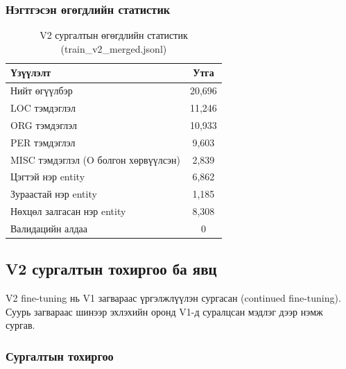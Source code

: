 \subsubsection{Нэгтгэсэн өгөгдлийн статистик}

\begin{table}[h!]
\centering
\renewcommand{\arraystretch}{1.4}
\begin{tabular}{|l|c|}
\hline
\textbf{Үзүүлэлт} & \textbf{Утга} \\ \hline
Нийт өгүүлбэр & 20,696 \\ \hline
LOC тэмдэглэл & 11,246 \\ \hline
ORG тэмдэглэл & 10,933 \\ \hline
PER тэмдэглэл & 9,603 \\ \hline
MISC тэмдэглэл (O болгон хөрвүүлсэн) & 2,839 \\ \hline
Цэгтэй нэр entity & 6,862 \\ \hline
Зураастай нэр entity & 1,185 \\ \hline
Нөхцөл залгасан нэр entity & 8,308 \\ \hline
Валидацийн алдаа & 0 \\ \hline
\end{tabular}
\caption{V2 сургалтын өгөгдлийн статистик (train\_v2\_merged.jsonl)}
\label{tab:v2_data_stats}
\end{table}

\subsection{V2 сургалтын тохиргоо ба явц}

V2 fine-tuning нь V1 загвараас үргэлжлүүлэн сургасан (continued fine-tuning). Суурь загвараас шинээр эхлэхийн оронд V1-д суралцсан мэдлэг дээр нэмж сургав.

\subsubsection{Сургалтын тохиргоо}

